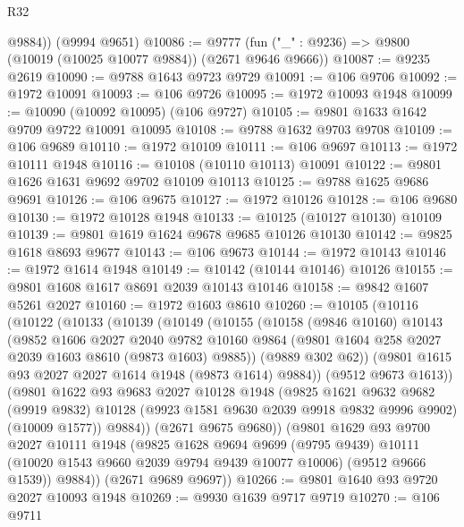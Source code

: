 \begin{lexlean}{R32}
\begin{coremodule}
        @9884))
    (@9994 @9651)
@10086 := @9777 (fun ("_" : @9236) => @9800 (@10019 (@10025 @10077 @9884)) (@2671 @9646 @9666))
@10087 := @9235 @2619
@10090 := @9788 @1643 @9723 @9729
@10091 := @106 @9706
@10092 := @1972 @10091
@10093 := @106 @9726
@10095 := @1972 @10093 @1948
@10099 := @10090 (@10092 @10095) (@106 @9727)
@10105 := @9801 @1633 @1642 @9709 @9722 @10091 @10095
@10108 := @9788 @1632 @9703 @9708
@10109 := @106 @9689
@10110 := @1972 @10109
@10111 := @106 @9697
@10113 := @1972 @10111 @1948
@10116 := @10108 (@10110 @10113) @10091
@10122 := @9801 @1626 @1631 @9692 @9702 @10109 @10113
@10125 := @9788 @1625 @9686 @9691
@10126 := @106 @9675
@10127 := @1972 @10126
@10128 := @106 @9680
@10130 := @1972 @10128 @1948
@10133 := @10125 (@10127 @10130) @10109
@10139 := @9801 @1619 @1624 @9678 @9685 @10126 @10130
@10142 := @9825 @1618 @8693 @9677
@10143 := @106 @9673
@10144 := @1972 @10143
@10146 := @1972 @1614 @1948
@10149 := @10142 (@10144 @10146) @10126
@10155 := @9801 @1608 @1617 @8691 @2039 @10143 @10146
@10158 := @9842 @1607 @5261 @2027
@10160 := @1972 @1603 @8610
@10260 := @10105
    (@10116
      (@10122
        (@10133
          (@10139
            (@10149
              (@10155
                (@10158
                  (@9846 @10160)
                  @10143
                  (@9852
                    @1606
                    @2027
                    @2040
                    @9782
                    @10160
                    @9864
                    (@9801 @1604 @258 @2027 @2039 @1603 @8610 (@9873 @1603) @9885))
                  (@9889 @302 @62))
                (@9801 @1615 @93 @2027 @2027 @1614 @1948 (@9873 @1614) @9884))
              (@9512 @9673 @1613))
            (@9801
              @1622
              @93
              @9683
              @2027
              @10128
              @1948
              (@9825
                @1621
                @9632
                @9682
                (@9919 @9832)
                @10128
                (@9923 @1581 @9630 @2039 @9918 @9832 @9996 @9902)
                (@10009 @1577))
              @9884))
          (@2671 @9675 @9680))
        (@9801
          @1629
          @93
          @9700
          @2027
          @10111
          @1948
          (@9825
            @1628
            @9694
            @9699
            (@9795 @9439)
            @10111
            (@10020 @1543 @9660 @2039 @9794 @9439 @10077 @10006)
            (@9512 @9666 @1539))
          @9884))
      (@2671 @9689 @9697))
@10266 := @9801 @1640 @93 @9720 @2027 @10093 @1948
@10269 := @9930 @1639 @9717 @9719
@10270 := @106 @9711

\end{coremodule}
\end{lexlean}
